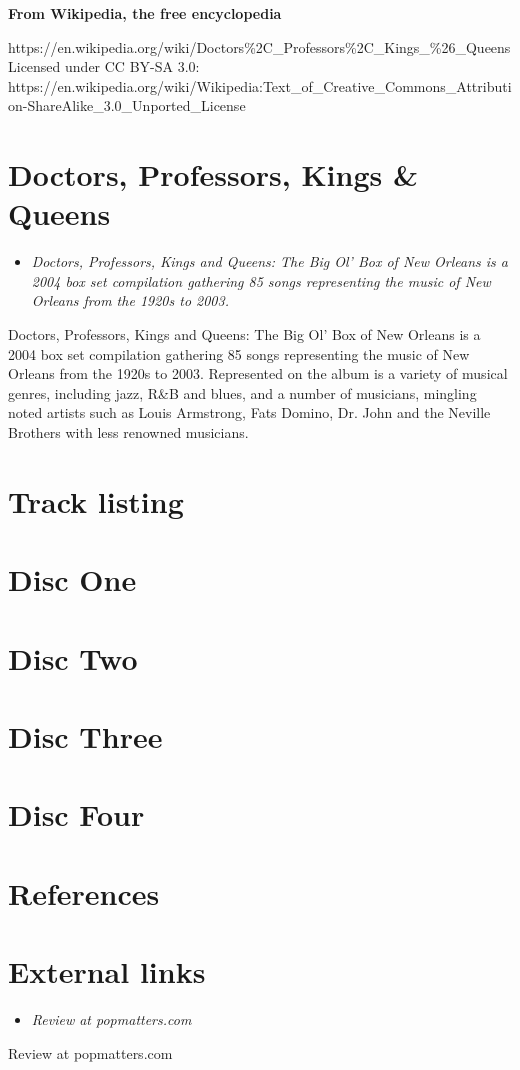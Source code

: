 \textbf{From Wikipedia, the free encyclopedia}

https://en.wikipedia.org/wiki/Doctors\%2C\_Professors\%2C\_Kings\_\%26\_Queens\\
Licensed under CC BY-SA 3.0:\\
https://en.wikipedia.org/wiki/Wikipedia:Text\_of\_Creative\_Commons\_Attribution-ShareAlike\_3.0\_Unported\_License

\section{Doctors, Professors, Kings \&
Queens}\label{doctors-professors-kings-queens}

\begin{itemize}
\item
  \emph{Doctors, Professors, Kings and Queens: The Big Ol' Box of New
  Orleans is a 2004 box set compilation gathering 85 songs representing
  the music of New Orleans from the 1920s to 2003.}
\end{itemize}

Doctors, Professors, Kings and Queens: The Big Ol' Box of New Orleans is
a 2004 box set compilation gathering 85 songs representing the music of
New Orleans from the 1920s to 2003. Represented on the album is a
variety of musical genres, including jazz, R\&B and blues, and a number
of musicians, mingling noted artists such as Louis Armstrong, Fats
Domino, Dr. John and the Neville Brothers with less renowned musicians.

\section{Track listing}\label{track-listing}

\section{Disc One}\label{disc-one}

\section{Disc Two}\label{disc-two}

\section{Disc Three}\label{disc-three}

\section{Disc Four}\label{disc-four}

\section{References}\label{references}

\section{External links}\label{external-links}

\begin{itemize}
\item
  \emph{Review at popmatters.com}
\end{itemize}

Review at popmatters.com
